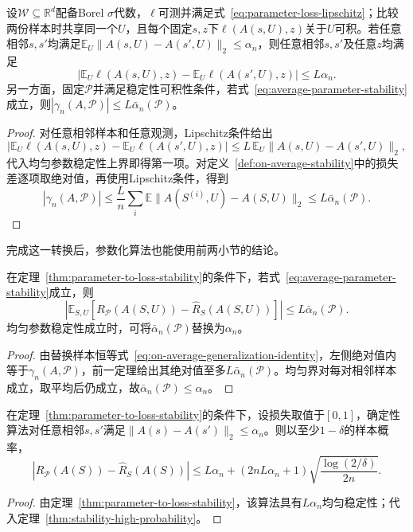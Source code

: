 \begin{theorem}[参数稳定性与损失稳定性]
\label{thm:parameter-to-loss-stability}
设$\mathcal W\subseteq\mathbb R^d$配备Borel $\sigma$代数，$\ell$可测并满足式~\eqref{eq:parameter-loss-lipschitz}；比较两份样本时共享同一个$U$，且每个固定$s,z$下$\ell(A(s,U),z)$关于$U$可积。若任意相邻$s,s'$均满足$\mathbb E_U\|A(s,U)-A(s',U)\|_2\leq\alpha_n$，则任意相邻$s,s'$及任意$z$均满足
\[
 \left|\mathbb E_U\ell(A(s,U),z)-\mathbb E_U\ell(A(s',U),z)\right|\leq L\alpha_n.
\]
另一方面，固定$\mathcal P$并满足稳定性可积性条件，若式~\eqref{eq:average-parameter-stability}成立，则$|\gamma_n(A,\mathcal P)|\leq L\bar\alpha_n(\mathcal P)$。
\end{theorem}
\begin{proof}
对任意相邻样本和任意观测，Lipschitz条件给出
\[
 |\mathbb E_U\ell(A(s,U),z)-\mathbb E_U\ell(A(s',U),z)|\leq L\,\mathbb E_U\|A(s,U)-A(s',U)\|_2,
\]
代入均匀参数稳定性上界即得第一项。对定义~\ref{def:on-average-stability}中的损失差逐项取绝对值，再使用Lipschitz条件，得到
\[
 |\gamma_n(A,\mathcal P)|\leq\frac Ln\sum_i\mathbb E\|A(S^{(i)},U)-A(S,U)\|_2\leq L\bar\alpha_n(\mathcal P).
\]
\end{proof}

完成这一转换后，参数化算法也能使用前两小节的结论。

\begin{theorem}[参数稳定性与期望泛化差]
\label{thm:parameter-expected-generalization}
在定理~\ref{thm:parameter-to-loss-stability}的条件下，若式~\eqref{eq:average-parameter-stability}成立，则
\begin{equation}
 \left|\mathbb E_{S,U}[R_{\mathcal P}(A(S,U))-\hat R_S(A(S,U))]\right|\leq L\bar\alpha_n(\mathcal P).
 \label{eq:parameter-generalization}
\end{equation}
均匀参数稳定性成立时，可将$\bar\alpha_n(\mathcal P)$替换为$\alpha_n$。
\end{theorem}
\begin{proof}
由替换样本恒等式~\eqref{eq:on-average-generalization-identity}，左侧绝对值内等于$\gamma_n(A,\mathcal P)$，前一定理给出其绝对值至多$L\bar\alpha_n(\mathcal P)$。均匀界对每对相邻样本成立，取平均后仍成立，故$\bar\alpha_n(\mathcal P)\leq\alpha_n$。
\end{proof}

\begin{theorem}[均匀参数稳定性的高概率泛化界]
\label{thm:parameter-high-probability}
在定理~\ref{thm:parameter-to-loss-stability}的条件下，设损失取值于$[0,1]$，确定性算法对任意相邻$s,s'$满足$\|A(s)-A(s')\|_2\leq\alpha_n$。则以至少$1-\delta$的样本概率，
\[
 |R_{\mathcal P}(A(S))-\hat R_S(A(S))|\leq L\alpha_n+(2nL\alpha_n+1)\sqrt{\frac{\log(2/\delta)}{2n}}.
\]
\end{theorem}
\begin{proof}
由定理~\ref{thm:parameter-to-loss-stability}，该算法具有$L\alpha_n$均匀稳定性；代入定理~\ref{thm:stability-high-probability}。
\end{proof}


